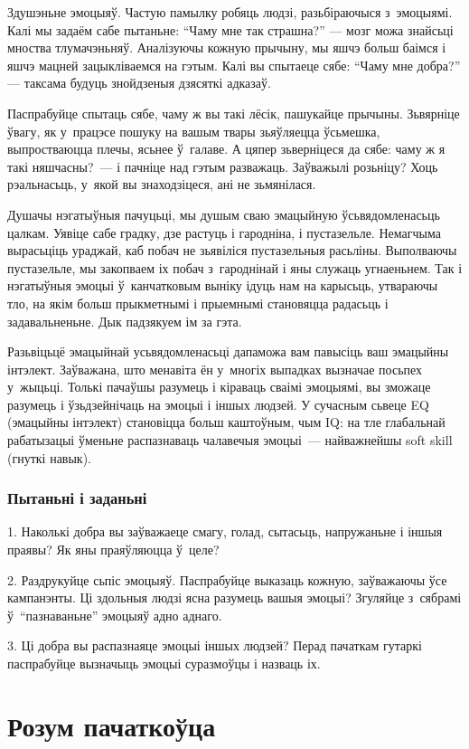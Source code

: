 Здушэньне эмоцыяў. Частую памылку робяць людзі, разьбіраючыся з~эмоцыямі. Калі мы задаём сабе пытаньне: ``Чаму мне так страшна?'' --- мозг можа знайсьці мноства тлумачэньняў. Аналізуючы кожную прычыну, мы яшчэ больш баімся і яшчэ мацней зацыкліваемся на гэтым. Калі вы спытаеце сябе: ``Чаму мне добра?'' --- таксама будуць знойдзеныя дзясяткі адказаў.

Паспрабуйце спытаць сябе, чаму ж вы такі лёсік, пашукайце прычыны. Зьвярніце ўвагу, як у~працэсе пошуку на вашым твары зьяўляецца ўсьмешка, выпростваюцца плечы, ясьнее ў~галаве. А цяпер зьверніцеся да сябе: чаму ж я такі няшчасны?~--- і пачніце над гэтым разважаць. Заўважылі розьніцу? Хоць рэальнасьць, у~якой вы знаходзіцеся, ані не зьмянілася.

Душачы нэгатыўныя пачуцьці, мы душым сваю эмацыйную ўсьвядомленасьць цалкам. Уявіце сабе градку, дзе растуць і гародніна, і пустазельле. Немагчыма вырасьціць ураджай, каб побач не зьявіліся пустазельныя расьліны. Выполваючы пустазельле, мы закопваем іх побач з~гароднінай і яны служаць угнаеньнем. Так і нэгатыўныя эмоцыі ў~канчатковым выніку ідуць нам на карысьць, утвараючы тло, на якім больш прыкметнымі і прыемнымі становяцца радасьць і задавальненьне. Дык падзякуем ім за гэта.

Разьвіцьцё эмацыйнай усьвядомленасьці дапаможа вам павысіць ваш эмацыйны інтэлект. Заўважана, што менавіта ён у~многіх выпадках вызначае посьпех у~жыцьці. Толькі пачаўшы разумець і кіраваць сваімі эмоцыямі, вы зможаце разумець і ўзьдзейнічаць на эмоцыі і іншых людзей. У сучасным сьвеце EQ (эмацыйны інтэлект) становіцца больш каштоўным, чым IQ: на тле глабальнай рабатызацыі ўменьне распазнаваць чалавечыя эмоцыі~--- найважнейшы soft skill (гнуткі навык).

\subsubsection{Пытаньні і заданьні}

1. Наколькі добра вы заўважаеце смагу, голад, сытасьць, напружаньне і іншыя праявы? Як яны праяўляюцца ў~целе?

2. Раздрукуйце сьпіс эмоцыяў. Паспрабуйце выказаць кожную, заўважаючы ўсе кампанэнты. Ці здольныя людзі ясна разумець вашыя эмоцыі? Згуляйце з~сябрамі ў~``пазнаваньне'' эмоцыяў адно аднаго.

3. Ці добра вы распазнаяце эмоцыі іншых людзей? Перад пачаткам гутаркі паспрабуйце вызначыць эмоцыі суразмоўцы і назваць іх.


\section{Розум пачаткоўца}


